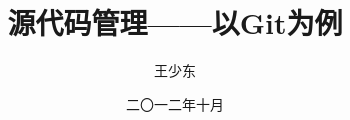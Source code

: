 %

\title[]{源代码管理——以Git为例}
\author[Wang]{王少东}

\date[2012.10]{二〇一二年十月}
\subject{Git基础}

\begin{frame}
  \titlepage
\end{frame}



%






